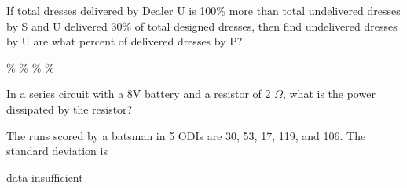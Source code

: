 \documentclass{exam}
\begin{document}
\begin{multicols}{2}
\begin{questions}
\question   If total dresses delivered by Dealer U is 100\% more than total undelivered dresses by S and U delivered 30\% of total designed dresses, then find undelivered dresses by U are what percent of delivered dresses by P?

\begin{randomizechoices}
\% 
\%  
\% 
\% 
\end{randomizechoices}\question   In a series circuit with a 8V battery and a resistor of 2 $\Omega$, what is the power dissipated by the resistor?

\begin{randomizechoices}
\end{randomizechoices}

\question The runs scored by a batsman in 5 ODIs are 30, 53, 17, 119, and 106. The standard deviation is


\begin{randomizechoices}
\choice data insufficient 
\end{randomizechoices}


\end{questions}
\end{multicols}
\vspace{1cm}

\end{document}
